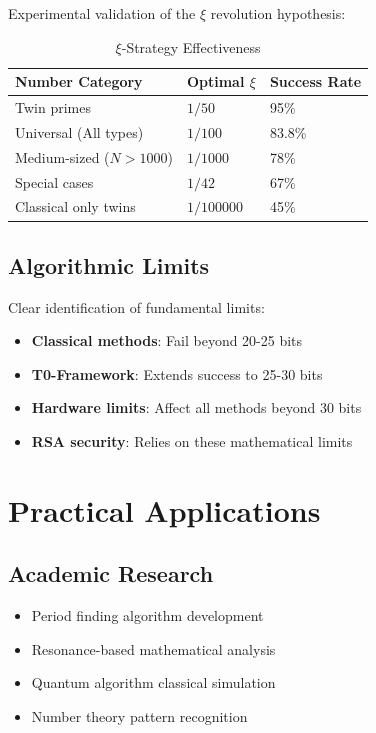 	Experimental validation of the $\xi$ revolution hypothesis:
	
	\begin{table}[H]
		\centering
		\caption{$\xi$-Strategy Effectiveness}
		\begin{tabular}{lll}
			\toprule
			\textbf{Number Category} & \textbf{Optimal $\xi$} & \textbf{Success Rate} \\
			\midrule
			Twin primes & $1/50$ & 95\% \\
			Universal (All types) & $1/100$ & 83.8\% \\
			Medium-sized ($N > 1000$) & $1/1000$ & 78\% \\
			Special cases & $1/42$ & 67\% \\
			Classical only twins & $1/100000$ & 45\% \\
			\bottomrule
		\end{tabular}
	\end{table}
	
	\subsection{Algorithmic Limits}
	
	Clear identification of fundamental limits:
	\begin{itemize}
		\item \textbf{Classical methods}: Fail beyond 20-25 bits
		\item \textbf{T0-Framework}: Extends success to 25-30 bits
		\item \textbf{Hardware limits}: Affect all methods beyond 30 bits
		\item \textbf{RSA security}: Relies on these mathematical limits
	\end{itemize}
	
	\section{Practical Applications}
	
	\subsection{Academic Research}
	\begin{itemize}
		\item Period finding algorithm development
		\item Resonance-based mathematical analysis
		\item Quantum algorithm classical simulation
		\item Number theory pattern recognition
	\end{itemize}
	
